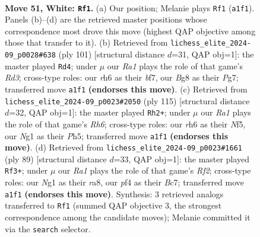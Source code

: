\documentclass[11pt]{article}
\begin{document}
\clearpage

\begin{figure}[p]\centering
\begin{subfigure}{0.46\textwidth}\centering
\resizebox{\linewidth}{!}{%
\newchessgame
\chessboard[
  setfen={6B1/3k4/7r/B7/P4pbp/1P6/1K6/R5N1 w - - 1 51},
  showmover=false,
  pgfstyle=straightmove, color=movearrow, markmove={a1-f1}
]}
\caption{}
\end{subfigure}\hfill
\begin{subfigure}{0.46\textwidth}\centering
\resizebox{\linewidth}{!}{%
\newchessgame
\chessboard[
  setfen={8/5Bpb/1k1r1p2/p6P/8/6P1/5P2/2R3K1 b - - 3 51},
  showmover=false,
  pgfstyle=straightmove, color=movearrow, markmove={d6-d4}
]}
\caption{}
\end{subfigure}
\\[4pt]
\begin{subfigure}{0.46\textwidth}\centering
\resizebox{\linewidth}{!}{%
\newchessgame
\chessboard[
  setfen={8/8/6p1/2B2nkp/R7/2P3br/1P2K3/8 b - - 1 58},
  showmover=false,
  pgfstyle=straightmove, color=movearrow, markmove={h3-h2}
]}
\caption{}
\end{subfigure}\hfill
\begin{subfigure}{0.46\textwidth}\centering
\resizebox{\linewidth}{!}{%
\newchessgame
\chessboard[
  setfen={R7/2b2rp1/1pk5/7p/1p6/3K3P/P7/8 b - - 1 45},
  showmover=false,
  pgfstyle=straightmove, color=movearrow, markmove={f7-f3}
]}
\caption{}
\end{subfigure}
\caption{\textbf{Move 51, White: \texttt{Rf1}.} (a) Our position; Melanie plays \texttt{Rf1} (\texttt{a1f1}). Panels (b)--(d) are the retrieved master positions whose correspondence most drove this move (highest QAP objective among those that transfer to it). (b) Retrieved from \texttt{lichess\_elite\_2024-09\_p0028\#638} (ply 101) [structural distance $d$=31, QAP obj=1]: the master played \texttt{Rd4}; under $\mu$ our \emph{Ra1} plays the role of that game's \emph{Rd3}; cross-type roles: our \emph{r}h6 as their \emph{b}f7, our \emph{B}g8 as their \emph{P}g7; transferred move \texttt{a1f1} \textbf{(endorses this move)}. (c) Retrieved from \texttt{lichess\_elite\_2024-09\_p0023\#2050} (ply 115) [structural distance $d$=32, QAP obj=1]: the master played \texttt{Rh2+}; under $\mu$ our \emph{Ra1} plays the role of that game's \emph{Rh6}; cross-type roles: our \emph{r}h6 as their \emph{N}f5, our \emph{N}g1 as their \emph{P}h5; transferred move \texttt{a1f1} \textbf{(endorses this move)}. (d) Retrieved from \texttt{lichess\_elite\_2024-09\_p0023\#1661} (ply 89) [structural distance $d$=33, QAP obj=1]: the master played \texttt{Rf3+}; under $\mu$ our \emph{Ra1} plays the role of that game's \emph{Rf2}; cross-type roles: our \emph{N}g1 as their \emph{r}a8, our \emph{p}f4 as their \emph{B}c7; transferred move \texttt{a1f1} \textbf{(endorses this move)}. Synthesis: 3 retrieved analogs transferred to \texttt{Rf1} (summed QAP objective 3, the strongest correspondence among the candidate moves); Melanie committed it via the \texttt{search} selector.}
\label{fig:thought-m100}
\end{figure}
\end{document}
